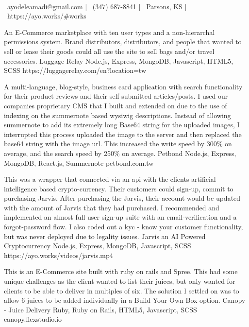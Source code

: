\documentclass[]{awesome-cv}
\begin{document}
    
\begin{center}
	  \\
	\vspace{2mm}
	{\faEnvelope\ ayodeleamadi@gmail.com} | {\faMobile\ (347) 687-8841} | {\faMapMarker\ Parsons, KS} | {\faLink\ https://ayo.works/\#works}
\end{center}
\begin{cventries}
	\cventry
	{An E-Commerce marketplace with ten user types and a non-hierarchal permissions system. Brand distributors, distributors, and people that wanted to sell or lease their goods could all use the site to sell bags and/or travel accessories.}
	{Luggage Relay}
	{Node.js, Express, MongoDB, Javascript, HTML5, SCSS}
	{https://luggagerelay.com/en?location=tw}
	{}
	
	\vspace{-5mm}
	\cventry
	{A multi-language, blog-style, business card application with search functionality for their product reviews and their self submitted articles/posts. I used our companies proprietary CMS that I built and extended on due to the use of indexing on the summernote based wysiwig descriptions. Instead of allowing summernote to add it\textquotesingle{}s extremely long Base64 string for the uploaded images, I interrupted this process uploaded the image to the server and then replaced the base64 string with the image url. This increased the write speed by 300\% on average, and the search speed by 250\% on average.}
	{Petbond}
	{Node.js, Express, MongoDB, React.js, Summernote}
	{petbond.com.tw}
	{}
	
	\vspace{-5mm}
	\cventry
	{This was a wrapper that connected via an api with the client\textquotesingle{}s artificial intelligence based crypto-currency. Their customer\textquotesingle{}s could sign-up, commit to purchasing Jarvis. After purchasing the Jarvis, their account would be updated with the amount of Jarvis that they had purchased. I recommended and implemented an almost full user sign-up suite with an email-verification and a forgot-password flow. I also coded out a kyc - know your customer functionality, but was never deployed due to legality issues.}
	{Jarvis an AI Powered Cryptocurrency}
	{Node.js, Express, MongoDB, Javascript, SCSS}
	{https://ayo.works/videos/jarvis.mp4}
	{}
	
	\vspace{-5mm}
	\cventry
	{This is an E-Commerce site built with ruby on rails and Spree. This had some unique challenges as the client wanted to list their juices, but only wanted for clients to be able to deliver in multiples of six. The solution I settled on was to allow 6 juices to be added individually in a Build Your Own Box option.}
	{Canopy - Juice Delivery}
	{Ruby, Ruby on Rails, HTML5, Javascript, SCSS}
	{canopy.flexstudio.io}
	{}
	
	\vspace{-5mm}
\end{cventries}
\end{document}
